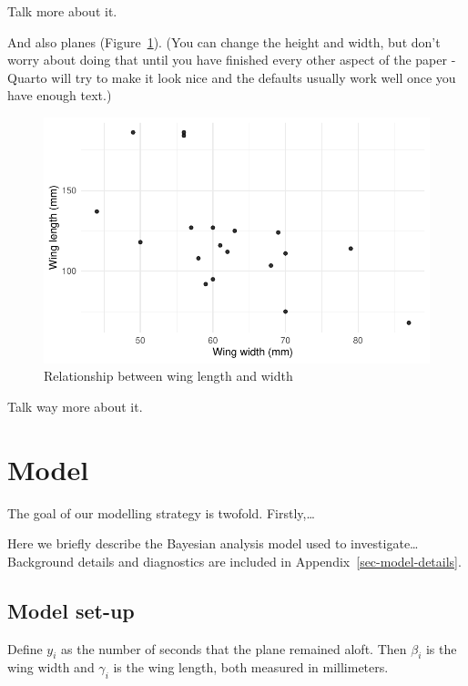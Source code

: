 \documentclass[
  letterpaper,
  DIV=11,
  numbers=noendperiod]{scrartcl}
\begin{document}
Talk more about it.

And also planes (Figure~\ref{fig-planes}). (You can change the height
and width, but don't worry about doing that until you have finished
every other aspect of the paper - Quarto will try to make it look nice
and the defaults usually work well once you have enough text.)

\begin{figure}

{\centering \includegraphics{paper_files/figure-pdf/fig-planes-1.pdf}

}

\caption{\label{fig-planes}Relationship between wing length and width}

\end{figure}

Talk way more about it.

\hypertarget{model}{%
\section{Model}\label{model}}

The goal of our modelling strategy is twofold. Firstly,\ldots{}

Here we briefly describe the Bayesian analysis model used to
investigate\ldots{} Background details and diagnostics are included in
Appendix~\ref{sec-model-details}.

\hypertarget{model-set-up}{%
\subsection{Model set-up}\label{model-set-up}}

Define \(y_i\) as the number of seconds that the plane remained aloft.
Then \(\beta_i\) is the wing width and \(\gamma_i\) is the wing length,
both measured in millimeters.
\end{document}
